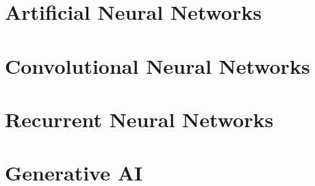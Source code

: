\documentclass[
]{book}
\begin{document}
\hypertarget{ann}{%
\chapter{Artificial Neural Networks}\label{ann}}

\hypertarget{cnn}{%
\chapter{Convolutional Neural Networks}\label{cnn}}

\hypertarget{rnn}{%
\chapter{Recurrent Neural Networks}\label{rnn}}

\hypertarget{gen-AI}{%
\chapter{Generative AI}\label{gen-AI}}

  
\end{document}
